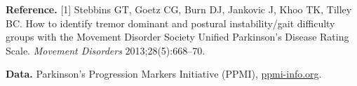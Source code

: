 \documentclass[10pt,a4paper]{article}
\begin{document}
{\footnotesize
\vspace{0.3em}
\noindent\textbf{Reference.} [1] Stebbins GT, Goetz CG, Burn DJ, Jankovic J, Khoo TK,
Tilley BC. How to identify tremor dominant and postural instability/gait difficulty
groups with the Movement Disorder Society Unified Parkinson's Disease Rating Scale.
\emph{Movement Disorders} 2013;28(5):668--70.

\vspace{0.2em}
\noindent\textbf{Data.} Parkinson's Progression Markers Initiative (PPMI),
\url{ppmi-info.org}. %
}
\end{document}
